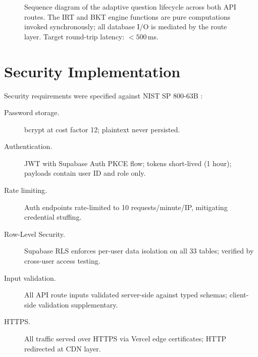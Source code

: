 \begin{figure}[H]
\caption{Sequence diagram of the adaptive question lifecycle across both API
routes. The IRT and BKT engine functions are pure computations invoked
synchronously; all database I/O is mediated by the route layer. Target
round-trip latency: $<500$\,ms.}
\label{fig:sequence_diagram}
\end{figure}

\section{Security Implementation}
\label{sec:impl_security}

Security requirements were specified against NIST SP 800-63B \parencite{nist2017}:

\begin{description}
  \item[Password storage.] bcrypt at cost factor 12; plaintext never persisted.
  \item[Authentication.] JWT with Supabase Auth PKCE flow; tokens short-lived (1 hour); payloads contain user ID and role only.
  \item[Rate limiting.] Auth endpoints rate-limited to 10 requests/minute/IP, mitigating credential stuffing.
  \item[Row-Level Security.] Supabase RLS enforces per-user data isolation on all 33 tables; verified by cross-user access testing.
  \item[Input validation.] All API route inputs validated server-side against typed schemas; client-side validation supplementary.
  \item[HTTPS.] All traffic served over HTTPS via Vercel edge certificates; HTTP redirected at CDN layer.
\end{description}

